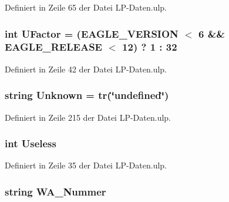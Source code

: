 Definiert in Zeile 65 der Datei L\+P-\/\+Daten.\+ulp.

\hypertarget{_l_p-_daten_8ulp_af00947d6126fb9daaee10391a57f27d0}{}
\subsubsection[{U\+Factor}]{\setlength{\rightskip}{0pt plus 5cm}int U\+Factor = (E\+A\+G\+L\+E\+\_\+\+V\+E\+R\+S\+I\+O\+N $<$ 6 \&\& E\+A\+G\+L\+E\+\_\+\+R\+E\+L\+E\+A\+S\+E $<$ 12) ? 1 \+: 32}\label{_l_p-_daten_8ulp_af00947d6126fb9daaee10391a57f27d0}


Definiert in Zeile 42 der Datei L\+P-\/\+Daten.\+ulp.

\hypertarget{_l_p-_daten_8ulp_a3757e4da4d101b9a9ac8b9cc77bcef5a}{}
\subsubsection[{Unknown}]{\setlength{\rightskip}{0pt plus 5cm}string Unknown = {\bf tr}(\char`\"{}undefined\char`\"{})}\label{_l_p-_daten_8ulp_a3757e4da4d101b9a9ac8b9cc77bcef5a}


Definiert in Zeile 215 der Datei L\+P-\/\+Daten.\+ulp.

\hypertarget{_l_p-_daten_8ulp_aa7101a3f84189d12615e8fac74b8eee4}{}
\subsubsection[{Useless}]{\setlength{\rightskip}{0pt plus 5cm}int Useless}\label{_l_p-_daten_8ulp_aa7101a3f84189d12615e8fac74b8eee4}


Definiert in Zeile 35 der Datei L\+P-\/\+Daten.\+ulp.

\hypertarget{_l_p-_daten_8ulp_a190c864c13eed4946823ed73c1865058}{}
\subsubsection[{W\+A\+\_\+\+Nummer}]{\setlength{\rightskip}{0pt plus 5cm}string W\+A\+\_\+\+Nummer}\label{_l_p-_daten_8ulp_a190c864c13eed4946823ed73c1865058}


